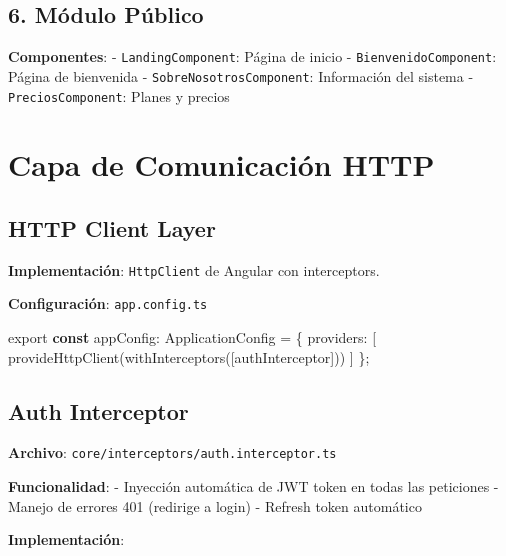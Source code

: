 \documentclass[
  spanish,
  11pt,
  letterpaper,
]{book}
\newenvironment{Shaded}{\begin{snugshade}}{\end{snugshade}}
\newcommand{\FunctionTok}[1]{\textcolor[rgb]{0.28,0.35,0.67}{#1}}
\newcommand{\ImportTok}[1]{\textcolor[rgb]{0.00,0.46,0.62}{#1}}
\newcommand{\KeywordTok}[1]{\textcolor[rgb]{0.00,0.23,0.31}{\textbf{#1}}}
\newcommand{\NormalTok}[1]{\textcolor[rgb]{0.00,0.23,0.31}{#1}}
\newcommand{\OperatorTok}[1]{\textcolor[rgb]{0.37,0.37,0.37}{#1}}
\begin{document}
\subsection{6. Módulo Público}\label{muxf3dulo-puxfablico-1}

\textbf{Componentes}: - \texttt{LandingComponent}: Página de inicio -
\texttt{BienvenidoComponent}: Página de bienvenida -
\texttt{SobreNosotrosComponent}: Información del sistema -
\texttt{PreciosComponent}: Planes y precios

\section{Capa de Comunicación HTTP}\label{capa-de-comunicaciuxf3n-http}

\subsection{HTTP Client Layer}\label{http-client-layer-1}

\textbf{Implementación}: \texttt{HttpClient} de Angular con
interceptors.

\textbf{Configuración}: \texttt{app.config.ts}

\begin{Shaded}
\begin{Highlighting}[]
\ImportTok{export} \KeywordTok{const}\NormalTok{ appConfig}\OperatorTok{:}\NormalTok{ ApplicationConfig }\OperatorTok{=}\NormalTok{ \{}
\NormalTok{  providers}\OperatorTok{:}\NormalTok{ [}
    \FunctionTok{provideHttpClient}\NormalTok{(}\FunctionTok{withInterceptors}\NormalTok{([authInterceptor]))}
\NormalTok{  ]}
\NormalTok{\}}\OperatorTok{;}
\end{Highlighting}
\end{Shaded}

\subsection{Auth Interceptor}\label{auth-interceptor-1}

\textbf{Archivo}: \texttt{core/interceptors/auth.interceptor.ts}

\textbf{Funcionalidad}: - Inyección automática de JWT token en todas las
peticiones - Manejo de errores 401 (redirige a login) - Refresh token
automático

\textbf{Implementación}:
\end{document}
